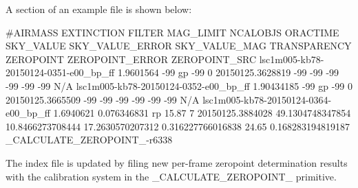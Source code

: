 \documentclass[twoside,11pt,nolof]{starlink}
\providecommand{\task}[1]{\textsf{#1}}
\begin{document}
A section of an example file is shown below:
\begin{terminalv}
#AIRMASS EXTINCTION FILTER MAG_LIMIT NCALOBJS ORACTIME SKY_VALUE SKY_VALUE_ERROR SKY_VALUE_MAG TRANSPARENCY ZEROPOINT ZEROPOINT_ERROR ZEROPOINT_SRC
lsc1m005-kb78-20150124-0351-e00_bp_ff 1.9601564 -99 gp -99 0 20150125.3628819 -99 -99 -99 -99 -99 -99 N/A
lsc1m005-kb78-20150124-0352-e00_bp_ff 1.90434185 -99 gp -99 0 20150125.3665509 -99 -99 -99 -99 -99 -99 N/A
lsc1m005-kb78-20150124-0364-e00_bp_ff 1.6940621 0.076346831 rp 15.87 7 20150125.3884028 49.1304748347854 10.8466273708444 17.2630570207312 0.316227766016838 24.65 0.168283194819187 _CALCULATE_ZEROPOINT_-r6338
\end{terminalv}

The index file is updated by filing new per-frame zeropoint determination results with the
calibration system in the \task{\_CALCULATE\_ZEROPOINT\_} primitive.
\end{document}
